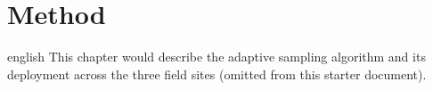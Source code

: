 \chapter{Method}
\label{chap-method}

\begin{otherlanguage*}{english}
This chapter would describe the adaptive sampling algorithm and its
deployment across the three field sites (omitted from this starter
document).
\end{otherlanguage*}

